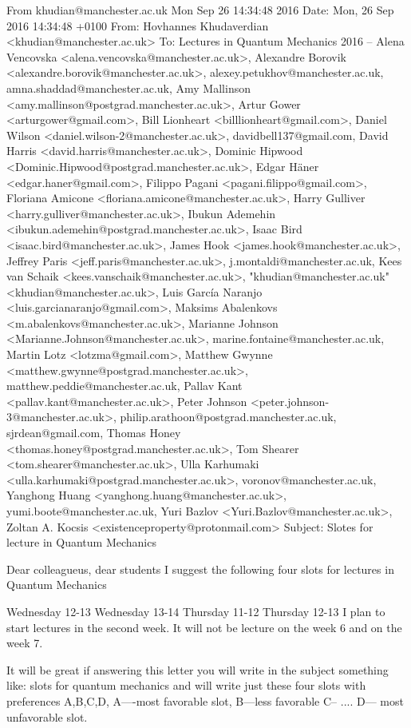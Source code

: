 From khudian@manchester.ac.uk Mon Sep 26 14:34:48 2016
Date: Mon, 26 Sep 2016 14:34:48 +0100
From: Hovhannes Khudaverdian <khudian@manchester.ac.uk>
To: Lectures in Quantum Mechanics 2016 -- Alena Vencovska <alena.vencovska@manchester.ac.uk>, Alexandre Borovik <alexandre.borovik@manchester.ac.uk>, alexey.petukhov@manchester.ac.uk, amna.shaddad@manchester.ac.uk, Amy Mallinson <amy.mallinson@postgrad.manchester.ac.uk>, Artur Gower <arturgower@gmail.com>, Bill Lionheart <billlionheart@gmail.com>, Daniel Wilson <daniel.wilson-2@manchester.ac.uk>, davidbell137@gmail.com, David Harris <david.harris@manchester.ac.uk>, Dominic Hipwood <Dominic.Hipwood@postgrad.manchester.ac.uk>, Edgar Häner <edgar.haner@gmail.com>, Filippo Pagani <pagani.filippo@gmail.com>, Floriana Amicone <floriana.amicone@manchester.ac.uk>, Harry Gulliver <harry.gulliver@manchester.ac.uk>, Ibukun Ademehin <ibukun.ademehin@postgrad.manchester.ac.uk>, Isaac Bird <isaac.bird@manchester.ac.uk>, James Hook <james.hook@manchester.ac.uk>, Jeffrey Paris <jeff.paris@manchester.ac.uk>, j.montaldi@manchester.ac.uk, Kees van Schaik <kees.vanschaik@manchester.ac.uk>, "khudian@manchester.ac.uk" <khudian@manchester.ac.uk>, Luis García Naranjo <luis.garcianaranjo@gmail.com>, Maksims Abalenkovs <m.abalenkovs@manchester.ac.uk>, Marianne Johnson <Marianne.Johnson@manchester.ac.uk>, marine.fontaine@manchester.ac.uk, Martin Lotz <lotzma@gmail.com>, Matthew Gwynne <matthew.gwynne@postgrad.manchester.ac.uk>, matthew.peddie@manchester.ac.uk, Pallav Kant <pallav.kant@manchester.ac.uk>, Peter Johnson <peter.johnson-3@manchester.ac.uk>, philip.arathoon@postgrad.manchester.ac.uk, sjrdean@gmail.com, Thomas Honey <thomas.honey@postgrad.manchester.ac.uk>, Tom Shearer <tom.shearer@manchester.ac.uk>, Ulla Karhumaki <ulla.karhumaki@postgrad.manchester.ac.uk>, voronov@manchester.ac.uk, Yanghong Huang <yanghong.huang@manchester.ac.uk>, yumi.boote@manchester.ac.uk, Yuri Bazlov <Yuri.Bazlov@manchester.ac.uk>, Zoltan A. Kocsis <existenceproperty@protonmail.com>
Subject: Slotes for lecture in Quantum Mechanics


   Dear colleagueus, dear students
I suggest the following four slots
for lectures in Quantum Mechanics

    Wednesday  12-13
    Wednesday  13-14
    Thursday   11-12
    Thursday   12-13
I plan to start lectures in the second week.
It will not be lecture on the week 6 and on the week 7.

It will be great if answering this letter
you will write in the subject something like:
slots for quantum mechanics
and will write just these four slots with
   preferences A,B,C,D,
A----most favorable slot,
B---less favorable
C-- ....
D--- most unfavorable slot.

